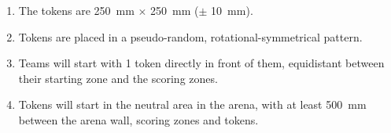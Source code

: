 \begin{enumerate}
  \item The tokens are \SI{250}{mm} $\times$ \SI{250}{mm} ($\pm$ \SI{10}{mm}).
  \item Tokens are placed in a pseudo-random, rotational-symmetrical pattern.
  \item Teams will start with 1 token directly in front of them, equidistant
        between their starting zone and the scoring zones.
  \item Tokens will start in the neutral area in the arena, with at least \SI{500}{mm}
        between the arena wall, scoring zones and tokens.
\end{enumerate}
